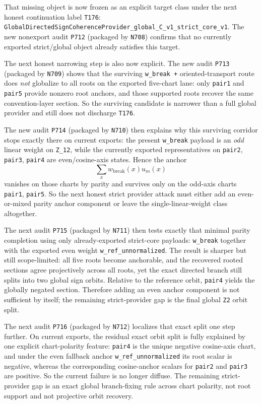 \documentclass[11pt,a4paper]{article}
\begin{document}
That missing object is now frozen as an explicit target class under the next honest continuation label \texttt{T176}:
\texttt{GlobalDirectedSignCoherenceProvider\_global\_C\_v1\_strict\_core\_v1}. The new nonexport audit \texttt{P712}
(packaged by \texttt{N708}) confirms that no currently exported strict/global object already satisfies this target.

The next honest narrowing step is also now explicit. The new audit \texttt{P713} (packaged by \texttt{N709}) shows that the
surviving \texttt{w\_break +} oriented-transport route does \emph{not} globalize to all roots on the exported five-chart lane:
only \texttt{pair1} and \texttt{pair5} provide nonzero root anchors, and those supported roots recover the same convention-layer
section. So the surviving candidate is narrower than a full global provider and still does not discharge \texttt{T176}.

The new audit \texttt{P714} (packaged by \texttt{N710}) then explains why this surviving corridor stops exactly there on current exports:
the present \texttt{w\_break} payload is an \emph{odd} linear weight on \texttt{Z\_12}, while the currently exported representatives on
\texttt{pair2}, \texttt{pair3}, \texttt{pair4} are even/cosine-axis states. Hence the anchor
\[
\sum_x w_{\mathrm{break}}(x)u_m(x)
\]
vanishes on those charts by parity and survives only on the odd-axis charts \texttt{pair1}, \texttt{pair5}. So the next honest strict
provider attack must either add an even-or-mixed parity anchor component or leave the single-linear-weight class altogether.

The next audit \texttt{P715} (packaged by \texttt{N711}) then tests exactly that minimal parity completion using only already-exported
strict-core payloads: \texttt{w\_break} together with the exported even weight \texttt{w\_ref\_unnormalized}. The result is sharper but
still scope-limited: all five roots become anchorable, and the recovered rooted sections agree projectively across all roots, yet the
exact directed branch still splits into two global sign orbits. Relative to the reference orbit, \texttt{pair4} yields the globally
negated section. Therefore adding an even anchor component is not sufficient by itself; the remaining strict-provider gap is the final
global \texttt{Z2} orbit split.

The next audit \texttt{P716} (packaged by \texttt{N712}) localizes that exact split one step further. On current exports, the residual
exact orbit split is fully explained by one explicit chart-polarity feature: \texttt{pair4} is the unique negative cosine-axis chart,
and under the even fallback anchor \texttt{w\_ref\_unnormalized} its root scalar is negative, whereas the corresponding cosine-anchor
scalars for \texttt{pair2} and \texttt{pair3} are positive. So the current failure is no longer diffuse. The remaining strict-provider
gap is an exact global branch-fixing rule across chart polarity, not root support and not projective orbit recovery.
\end{document}
